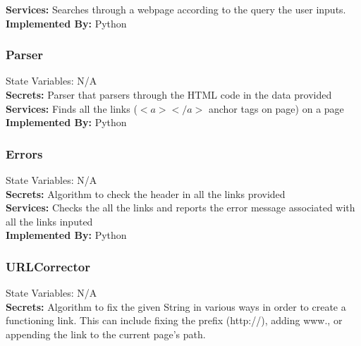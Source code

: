 \documentclass[titlepage]{article}
\begin{document}
{\textbf{Services:}
Searches through a webpage according to the query the user inputs.\\

\textbf{Implemented By:}
Python

\subsubsection{Parser}

State Variables: N/A\\

\textbf{Secrets:}
Parser that parsers through the HTML code in the data provided\\

\textbf{Services:}
Finds all the links (${<a></a>}$ anchor tags on page) on a page \\

\textbf{Implemented By:}
Python

\subsubsection{ Errors}
State Variables: N/A\\

\textbf{Secrets:}
Algorithm to check the header in all the links provided \\

\textbf{Services:}
Checks the all the links and reports the error message associated with all the links inputed\\

\textbf{Implemented By:} Python

\subsubsection{URLCorrector}
State Variables: N/A\\

\textbf{Secrets:}
Algorithm to fix the given String in various ways in order to create a functioning link. This can include fixing the prefix (http://), adding www., or appending the link to the current page's path.\\

}
\end{document}
